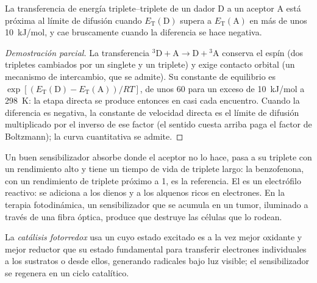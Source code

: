 \begin{proposition}\label{prop:b3:photochemistry:sensitisation-condition}
La transferencia de energía triplete--triplete de un dador D a un aceptor A está próxima al
límite de difusión cuando $E_{\mathrm T}(\mathrm D)$ supera a $E_{\mathrm T}(\mathrm A)$ en más de unos \qty{10}{kJ/mol}, y
cae bruscamente cuando la diferencia se hace negativa.
\end{proposition}

\begin{proof}[Demostración parcial]
La transferencia ${}^3\mathrm D + \mathrm A \to \mathrm D + {}^3\mathrm A$ conserva el espín (dos tripletes cambiados por un
singlete y un triplete) y exige contacto orbital (un mecanismo de intercambio, que se
admite). Su constante de equilibrio es $\exp[(E_{\mathrm T}(\mathrm D) - E_{\mathrm T}(\mathrm A))/RT]$, de unos 60 para un
exceso de \qty{10}{kJ/mol} a \qty{298}{K}: la etapa directa se produce entonces en casi cada
encuentro. Cuando la diferencia es negativa, la constante de velocidad directa es el
límite de difusión multiplicado por el inverso de ese factor (el sentido cuesta arriba paga
el factor de Boltzmann); la curva cuantitativa se admite.
\end{proof}

Un buen sensibilizador absorbe donde el aceptor no lo hace, pasa a su triplete
con un rendimiento alto y tiene un tiempo de vida de triplete largo: la benzofenona, con un
rendimiento de triplete próximo a 1, es la referencia. El  es un electrófilo
reactivo: se adiciona a los dienos y a los alquenos ricos en electrones. En la terapia
fotodinámica, un sensibilizador que se acumula en un tumor, iluminado a través de una
fibra óptica, produce  que destruye las células que lo rodean.

\begin{definition}\label{def:b3:photochemistry:photoredox}
La \emph{catálisis fotorredox} usa un 
cuyo estado excitado es a la vez mejor oxidante y mejor reductor que su
estado fundamental para transferir electrones individuales a los sustratos o desde ellos, generando
radicales bajo luz visible; el sensibilizador se regenera en un ciclo
catalítico.
\end{definition}


